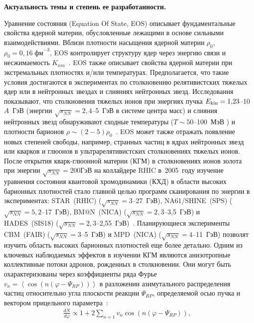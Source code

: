 \nocite{Mamaev:2020lpi,Mamaev:2020qom,Mamaev:2023fpr,Mamaev:2023yhz,HADES:2020lob,Mamaev:2024,Mamaev:2024-1,Mamaev:2024-2,doi:10.1142/S021830132441009X}

\textbf{Актуальность темы и степень ее разработанности.}

Уравнение состояния (Equation Of State, EOS)  описывает фундаментальные свойства ядерной материи, обусловленные лежащими в основе сильными взаимодействиями.  
Вблизи плотности насыщения ядерной материи $\rho_{0}$, $\rho_{0}=0{,}16\;\text{фм}^{-3}$,  EOS контролирует структуру ядер через энергию связи и несжимаемость $K_{nm}$~\cite{Danielewicz:2002pu}.
EOS также  описывает свойства ядерной материи при экстремальных плотностях и/или температурах.
Предполагается, что такие условия достигаются в экспериментах по столкновению релятивистских тяжелых ядер или в нейтронных звездах и слияниях нейтронных звезд. 
Исследования показывают, что столкновения тяжелых ионов при энергиях пучка  $E_{\rm kin}=1{,}23$--10$A$~ГэВ (энергии $\sqrt{s_{NN}} = 2{,}4$--5~ГэВ в системе центра масс)  и слияния нейтронных звезд обнаруживают сходные температуры ($T\sim  50$--100~МэВ ) и плотности барионов $\rho \sim (2-5)\rho_{0}$~\cite{eos2024}.
EOS может также отражать появление новых степеней свободы, например, странных частиц в ядрах нейтронных звезд или кварков и глюонов в ультрарелятивистских столкновениях тяжелых ионов. 
После открытия  кварк-глюонной материи (КГМ) в столкновениях ионов золота при энергии $\sqrt{s_{NN}}=200$\;ГэВ  на коллайдере RHIC в~2005~году изучение уравнения состояния  квантовой хромодинамики (КХД) в области высоких барионных плотностей стало главной целью программ сканирования по энергии в экспериментах: STAR~(RHIC) ($\sqrt{s_{NN}} = 3$--27~ГэВ), NA61/SHINE~(SPS) ($\sqrt{s_{NN}} = 5{,}2$--17~ГэВ), BM@N~(NICA) ($\sqrt{s_{NN}} = 2{,}3$--3,5~ГэВ) и HADES~(SIS18) ($\sqrt{s_{NN}} = 2{,}3$--2,55~ГэВ)~\cite{eos2024,bmn,HADES:2009aat}. 
Планирующиеся эксперименты CBM~(FAIR) ($\sqrt{s_{NN}}=3$--5~ГэВ) и MPD~(NICA) ($\sqrt{s_{NN}}=4$--11~ГэВ)  позволят изучить  область высоких барионных плотностей еще более детально.
Одним из ключевых наблюдаемых эффектов в изучении КГМ являются анизотропные коллективные потоки адронов, рожденных в столкновении. Они могут быть охарактеризованы через
коэффициенты ряда Фурье $v_n=\left\langle \cos\left( n \left( \varphi - \Psi_{RP} \right) \right) \right\rangle$ в разложении азимутального распределения частиц относительно угла плоскости реакции $\Psi_{RP}$, определяемой осью пучка и вектором прицельного параметра~\cite{Voloshin:2008dg}:
\begin{eqnarray}
   \frac{dN}{d\varphi} \propto 1 + 2 \sum_{n=1} v_n \cos\left( n \left( \varphi - \Psi_{RP} \right) \right),
\end{eqnarray}
